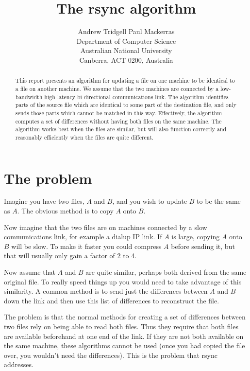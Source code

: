 \documentclass[a4paper]{article}
\begin{document}
\title{The rsync algorithm}

\author{Andrew Tridgell \quad\quad Paul Mackerras\\
Department of Computer Science \\
Australian National University \\
Canberra, ACT 0200, Australia}

\maketitle

\begin{abstract}
  This report presents an algorithm for updating a file on one machine
  to be identical to a file on another machine.  We assume that the
  two machines are connected by a low-bandwidth high-latency
  bi-directional communications link.  The algorithm identifies parts
  of the source file which are identical to some part of the
  destination file, and only sends those parts which cannot be matched
  in this way.  Effectively, the algorithm computes a set of
  differences without having both files on the same machine.  The
  algorithm works best when the files are similar, but will also
  function correctly and reasonably efficiently when the files are
  quite different.
\end{abstract}

\section{The problem}

Imagine you have two files, $A$ and $B$, and you wish to update $B$ to be
the same as $A$. The obvious method is to copy $A$ onto $B$.

Now imagine that the two files are on machines connected by a slow
communications link, for example a dialup IP link.  If $A$ is large,
copying $A$ onto $B$ will be slow.  To make it faster you could
compress $A$ before sending it, but that will usually only gain a
factor of 2 to 4.

Now assume that $A$ and $B$ are quite similar, perhaps both derived
from the same original file. To really speed things up you would need
to take advantage of this similarity. A common method is to send just
the differences between $A$ and $B$ down the link and then use this
list of differences to reconstruct the file.

The problem is that the normal methods for creating a set of
differences between two files rely on being able to read both files.
Thus they require that both files are available beforehand at one end
of the link.  If they are not both available on the same machine,
these algorithms cannot be used (once you had copied the file over,
you wouldn't need the differences).  This is the problem that rsync
addresses.
\end{document}
